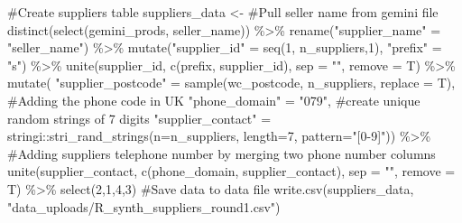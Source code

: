 \documentclass[
  letterpaper,
  DIV=11,
  numbers=noendperiod]{scrartcl}
\newenvironment{Shaded}{\begin{snugshade}}{\end{snugshade}}
\newcommand{\AttributeTok}[1]{\textcolor[rgb]{0.40,0.45,0.13}{#1}}
\newcommand{\CommentTok}[1]{\textcolor[rgb]{0.37,0.37,0.37}{#1}}
\newcommand{\DecValTok}[1]{\textcolor[rgb]{0.68,0.00,0.00}{#1}}
\newcommand{\FunctionTok}[1]{\textcolor[rgb]{0.28,0.35,0.67}{#1}}
\newcommand{\NormalTok}[1]{\textcolor[rgb]{0.00,0.23,0.31}{#1}}
\newcommand{\OtherTok}[1]{\textcolor[rgb]{0.00,0.23,0.31}{#1}}
\newcommand{\SpecialCharTok}[1]{\textcolor[rgb]{0.37,0.37,0.37}{#1}}
\newcommand{\StringTok}[1]{\textcolor[rgb]{0.13,0.47,0.30}{#1}}
\begin{document}
\begin{Shaded}
\begin{Highlighting}[numbers=left,,]
\CommentTok{\#Create suppliers table}
\NormalTok{suppliers\_data }\OtherTok{\textless{}{-}} 
  \CommentTok{\#Pull seller name from gemini file}
  \FunctionTok{distinct}\NormalTok{(}\FunctionTok{select}\NormalTok{(gemini\_prods, seller\_name)) }\SpecialCharTok{\%\textgreater{}\%}
  \FunctionTok{rename}\NormalTok{(}\StringTok{"supplier\_name"} \OtherTok{=} \StringTok{"seller\_name"}\NormalTok{) }\SpecialCharTok{\%\textgreater{}\%}
  \FunctionTok{mutate}\NormalTok{(}\StringTok{"supplier\_id"} \OtherTok{=} \FunctionTok{seq}\NormalTok{(}\DecValTok{1}\NormalTok{, n\_suppliers,}\DecValTok{1}\NormalTok{),}
         \StringTok{"prefix"} \OtherTok{=} \StringTok{"s"}\NormalTok{) }\SpecialCharTok{\%\textgreater{}\%}
  \FunctionTok{unite}\NormalTok{(supplier\_id, }\FunctionTok{c}\NormalTok{(prefix, supplier\_id), }\AttributeTok{sep =} \StringTok{""}\NormalTok{, }\AttributeTok{remove =}\NormalTok{ T) }\SpecialCharTok{\%\textgreater{}\%}
  \FunctionTok{mutate}\NormalTok{(}
    \StringTok{"supplier\_postcode"} \OtherTok{=}
      \FunctionTok{sample}\NormalTok{(wc\_postcode, n\_suppliers, }\AttributeTok{replace =}\NormalTok{ T),}
    \CommentTok{\#Adding the phone code in UK}
    \StringTok{"phone\_domain"} \OtherTok{=} \StringTok{"079"}\NormalTok{,}
    \CommentTok{\#create unique random strings of 7 digits}
    \StringTok{"supplier\_contact"} \OtherTok{=} 
\NormalTok{      stringi}\SpecialCharTok{::}\FunctionTok{stri\_rand\_strings}\NormalTok{(}\AttributeTok{n=}\NormalTok{n\_suppliers, }\AttributeTok{length=}\DecValTok{7}\NormalTok{, }\AttributeTok{pattern=}\StringTok{"[0{-}9]"}\NormalTok{)) }\SpecialCharTok{\%\textgreater{}\%}
  \CommentTok{\#Adding supplier\textquotesingle{}s telephone number by merging two phone number columns}
  \FunctionTok{unite}\NormalTok{(supplier\_contact, }
        \FunctionTok{c}\NormalTok{(phone\_domain, supplier\_contact), }\AttributeTok{sep =} \StringTok{""}\NormalTok{, }\AttributeTok{remove =}\NormalTok{ T) }\SpecialCharTok{\%\textgreater{}\%}
  \FunctionTok{select}\NormalTok{(}\DecValTok{2}\NormalTok{,}\DecValTok{1}\NormalTok{,}\DecValTok{4}\NormalTok{,}\DecValTok{3}\NormalTok{)}
\CommentTok{\#Save data to data file}
\FunctionTok{write.csv}\NormalTok{(suppliers\_data, }\StringTok{"data\_uploads/R\_synth\_suppliers\_round1.csv"}\NormalTok{)}


\end{Highlighting}
\end{Shaded}
\end{document}
